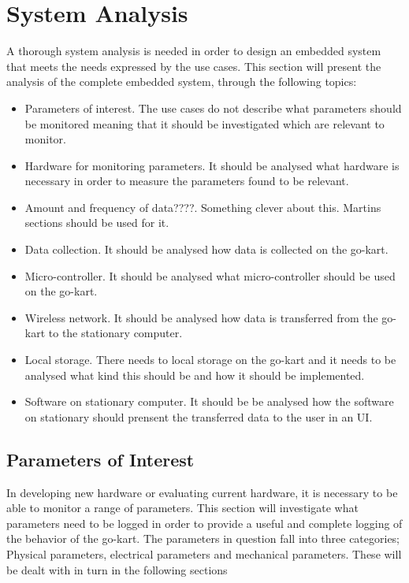 \section{System Analysis} %
\label{sec:system_analysis}
A thorough system analysis is needed in order to design an embedded system that meets the needs expressed by the use cases. 
This section will present the analysis of the complete embedded system, through the following topics:

\begin{itemize}
\item Parameters of interest. The use cases do not describe what parameters should be monitored meaning that it should be investigated which are relevant to monitor.
\item Hardware for monitoring parameters. It should be analysed what hardware is necessary in order to measure the parameters found to be relevant. 
\item Amount and frequency of data????. Something clever about this. Martins sections should be used for it.
\item Data collection. It should be analysed how data is collected on the go-kart.
\item Micro-controller. It should be analysed what micro-controller should be used on the go-kart.
\item Wireless network. It should be analysed how data is transferred from the go-kart 	to the stationary computer.
\item Local storage. There needs to local storage on the go-kart and it needs to be analysed what kind this should be and how it should be implemented.
\item Software on stationary computer. It should be be analysed how the software on stationary should prensent the transferred data to the user in an UI.
\end{itemize}

\subsection{Parameters of Interest}
\label{sec:parameters}
In developing new hardware or evaluating current hardware, it is necessary to be able to monitor a range of parameters.
This section will investigate what parameters need to be logged in order to provide a useful and complete logging of the behavior of the go-kart.
The parameters in question fall into three categories; Physical parameters, electrical parameters and mechanical parameters.
These will be dealt with in turn in the following sections
